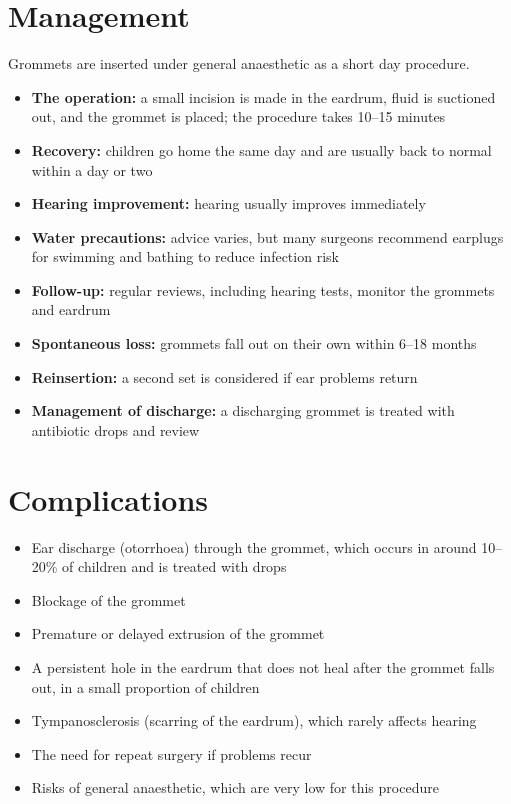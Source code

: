 \section*{Management}
Grommets are inserted under general anaesthetic as a short day procedure.

\begin{itemize}
    \item \textbf{The operation:} a small incision is made in the eardrum, fluid is suctioned out, and the grommet is placed; the procedure takes 10--15 minutes
    \item \textbf{Recovery:} children go home the same day and are usually back to normal within a day or two
    \item \textbf{Hearing improvement:} hearing usually improves immediately
    \item \textbf{Water precautions:} advice varies, but many surgeons recommend earplugs for swimming and bathing to reduce infection risk
    \item \textbf{Follow-up:} regular reviews, including hearing tests, monitor the grommets and eardrum
    \item \textbf{Spontaneous loss:} grommets fall out on their own within 6--18 months
    \item \textbf{Reinsertion:} a second set is considered if ear problems return
    \item \textbf{Management of discharge:} a discharging grommet is treated with antibiotic drops and review
\end{itemize}

\section*{Complications}
\begin{itemize}
    \item Ear discharge (otorrhoea) through the grommet, which occurs in around 10--20\% of children and is treated with drops
    \item Blockage of the grommet
    \item Premature or delayed extrusion of the grommet
    \item A persistent hole in the eardrum that does not heal after the grommet falls out, in a small proportion of children
    \item Tympanosclerosis (scarring of the eardrum), which rarely affects hearing
    \item The need for repeat surgery if problems recur
    \item Risks of general anaesthetic, which are very low for this procedure
\end{itemize}

